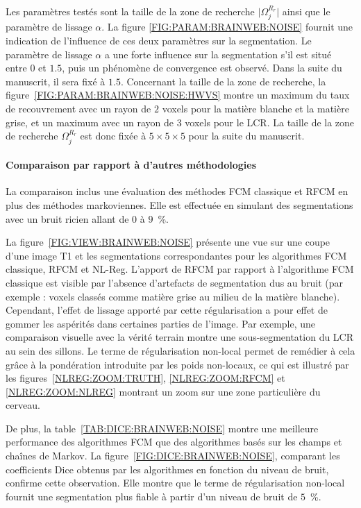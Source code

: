 Les paramètres testés sont la taille de la zone de recherche $\lvert \Omega^{R_{r}}_{j} \rvert$ ainsi que le paramètre de lissage $\alpha$.
La figure \ref{FIG:PARAM:BRAINWEB:NOISE} fournit une indication de l'influence de ces deux paramètres sur la segmentation.
Le paramètre de lissage $\alpha$ a une forte influence sur la segmentation s'il est situé entre $0$ et $1.5$, puis un phénomène de convergence est observé. 
Dans la suite du manuscrit, il sera fixé à $1.5$.
Concernant la taille de la zone de recherche, la figure~\ref{FIG:PARAM:BRAINWEB:NOISE:HWVS} montre un maximum du taux de recouvrement avec un rayon de $2$ voxels pour la matière blanche et la matière grise, et un maximum avec un rayon de $3$ voxels pour le LCR.
La taille de la zone de recherche $\Omega^{R_r}_{j}$ est donc fixée à $5\times5\times5$ pour la suite du manuscrit. 

\paragraph*{Comparaison par rapport à d'autres méthodologies}

La comparaison inclus une évaluation des méthodes FCM classique et RFCM \cite{Pham:CVIU:2001} en plus des méthodes markoviennes.
Elle est effectuée en simulant des segmentations avec un bruit ricien allant de $0$ à $9$~\%. 

La figure~\ref{FIG:VIEW:BRAINWEB:NOISE} présente une vue sur une coupe d'une image T1 et les segmentations correspondantes pour les algorithmes FCM classique, RFCM \cite{Pham:CVIU:2001} et NL-Reg.
L'apport de RFCM par rapport à l'algorithme FCM classique est visible par l'absence d'artefacts de segmentation dus au bruit (par exemple : voxels classés comme matière grise au milieu de la matière blanche).
Cependant, l'effet de lissage apporté par cette régularisation a pour effet de gommer les aspérités dans certaines parties de l'image. 
Par exemple, une comparaison visuelle avec la vérité terrain montre une sous-segmentation du LCR au sein des sillons.
Le terme de régularisation non-local permet de remédier à cela grâce à la pondération introduite par les poids non-locaux, ce qui est illustré par les figures~\ref{NLREG:ZOOM:TRUTH}, \ref{NLREG:ZOOM:RFCM} et \ref{NLREG:ZOOM:NLREG} montrant un zoom sur une zone particulière du cerveau.

De plus, la table~\ref{TAB:DICE:BRAINWEB:NOISE} montre une meilleure performance des algorithmes FCM que des algorithmes basés sur les champs et chaînes de Markov. 
La figure~\ref{FIG:DICE:BRAINWEB:NOISE}, comparant les coefficients Dice obtenus par les algorithmes en fonction du niveau de bruit, confirme cette observation.
Elle montre que le terme de régularisation non-local fournit une segmentation plus fiable à partir d'un niveau de bruit de $5$~\%.

